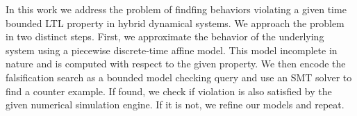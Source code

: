 In this work we address the problem of findfing behaviors violating a
given time bounded LTL property in hybrid dynamical systems. We
approach the problem in two distinct steps. First, we approximate the
behavior of the underlying system using a piecewise discrete-time
affine model. This model incomplete in nature and is computed with
respect to the given property.  We then encode the falsification
search as a bounded model checking query and use an SMT solver to find
a counter example. If found, we check if violation is also satisfied
by the given numerical simulation engine. If it is not, we refine our
models and repeat.
